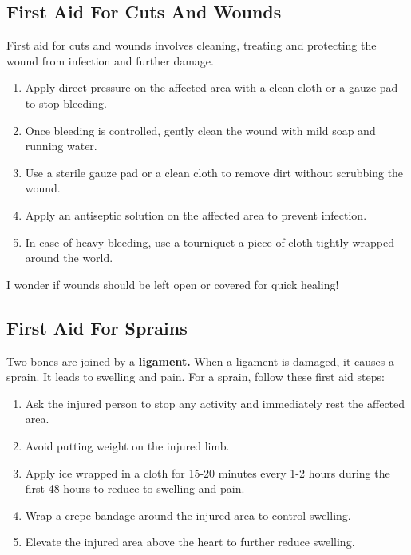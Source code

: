 \subsection{First Aid For Cuts And Wounds}
 First aid for cuts and wounds involves cleaning, treating and protecting the wound from infection and further damage.
 \begin{enumerate}
     \item Apply direct pressure on the affected area with a clean cloth or a gauze pad to stop bleeding.
     \item Once bleeding is controlled, gently clean the wound with mild soap and running water.
     \item Use a sterile gauze pad or a clean cloth to remove dirt without scrubbing the wound.
     \item Apply an antiseptic solution on the affected area to prevent infection.
     \item In case of heavy bleeding, use a tourniquet-a piece of cloth tightly wrapped around the world.
\end{enumerate}
\vspace{0.3in}
\par
I wonder if wounds should be left open or covered for quick healing!
\subsection{First Aid For Sprains}
Two bones are joined by a \textbf{ligament.} When a ligament is damaged, it causes a sprain. It leads to swelling and pain. For a sprain, follow these first aid steps:
\begin{enumerate}
     \item Ask the injured person to stop any activity and immediately rest the affected area.
     \item Avoid putting weight on the injured limb.
     \item Apply ice wrapped in a cloth for 15-20 minutes every 1-2 hours during the first 48 hours to reduce to swelling and pain.
     \item Wrap a crepe bandage around the injured area to control swelling.
     \item Elevate the injured area above the heart to further reduce swelling.
\end{enumerate}
\vspace{1.1in}
